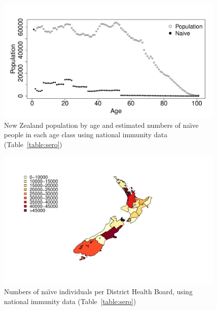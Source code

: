\documentclass{article}
\begin{document}
\begin{figure}
\begin{center}
\includegraphics{draftfinalreport-023}
\end{center}
\caption{New Zealand population by age and estimated numbers of na\"{\i}ve people in each age class using national immunity data (Table~\autoref{table:sero})}
\label{fig:naive}
\end{figure}

\begin{figure}[H]
     \begin{center}
     \includegraphics[width=1.2\textwidth]{naive_map.pdf}
     \end{center}
     \caption{Numbers of na\"{\i}ve individuals per District Health Board, using national immunity data (Table~\autoref{table:sero})}
     \label{fig:naive_map}
\end{figure}
\end{document}
